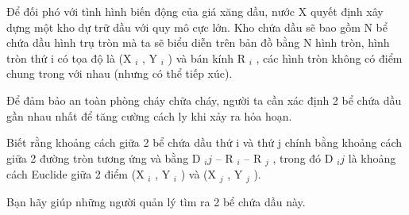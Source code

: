 Để đối phó với tình hình biến động của giá xăng dầu, nước X quyết định xây dựng một kho dự trữ dầu với quy mô cực lớn. Kho chứa dầu sẽ bao gồm N bể chứa dầu hình trụ tròn mà ta sẽ biểu diễn trên bản đồ bằng N hình tròn, hình tròn thứ i có tọa độ là (X   $_    i   $   , Y   $_    i   $   ) và bán kính R   $_    i   $   , các hình tròn không có điểm chung trong với nhau (nhưng có thể tiếp xúc).  

   Để đảm bảo an toàn phòng cháy chữa cháy, người ta cần xác định 2 bể chứa dầu gần nhau nhất để tăng cường cách ly khi xảy ra hỏa hoạn.  

   Biết rằng khoảng cách giữa 2 bể chứa dầu thứ i và thứ j chính bằng khoảng cách giữa 2 đường tròn tương ứng và bằng D   $_    ij   $   – R   $_    i   $   – R   $_    j   $   , trong đó D   $_    ij   $   là khoảng cách Euclide giữa 2 điểm (X   $_    i   $   , Y   $_    i   $   ) và (X   $_    j   $   , Y   $_    j   $   ).  

   Bạn hãy giúp những người quản lý tìm ra 2 bể chứa dầu này.